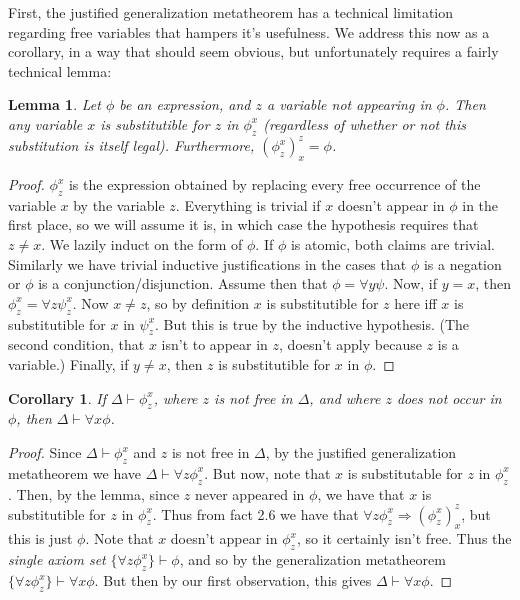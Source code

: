 \documentclass{article}
\theoremstyle{definition}
\theoremstyle{plain}
\theoremstyle{theorem}
\newtheorem{lemma}{Lemma}[section]
\newtheorem{corollary}{Corollary}[section]
\begin{document}
\par First, the justified generalization metatheorem has a technical limitation regarding free variables that hampers it's usefulness. We address this now as a corollary, in a way that should seem obvious, but unfortunately requires a fairly technical lemma:
\begin{lemma}
    Let $\phi$ be an expression, and $z$ a variable not appearing in $\phi$. Then any variable $x$ is substitutible for $z$ in $\phi_z^x$ (regardless of whether or not this substitution is itself legal). Furthermore, $(\phi_z^x)_x^z = \phi$.
\end{lemma}
\begin{proof}
    $\phi_z^x$ is the expression obtained by replacing every free occurrence of the variable $x$ by the variable $z$. Everything is trivial if $x$ doesn't appear in $\phi$ in the first place, so we will assume it is, in which case the hypothesis requires that $z \neq x$. We lazily induct on the form of $\phi$. If $\phi$ is atomic, both claims are trivial. Similarly we have trivial inductive justifications in the cases that $\phi$ is a negation or $\phi$ is a conjunction/disjunction. Assume then that $\phi = \forall y \psi$. Now, if $y = x$, then $\phi_z^x = \forall z \psi_z^x$. Now $x \neq z$, so by definition $x$ is substitutible for $z$ here iff $x$ is substitutible for $x$ in $\psi_z^x$. But this is true by the inductive hypothesis. (The second condition, that $x$ isn't to appear in $z$, doesn't apply because $z$ is a variable.) Finally, if $y \neq x$, then $z$ is substitutible for $x$ in $\phi$. 
\end{proof}
\begin{corollary}
    If $\Delta \vdash \phi_z^x$, where $z$ is not free in $\Delta$, and where $z$ does not occur in $\phi$, then $\Delta \vdash \forall x \phi$.
\end{corollary}
\begin{proof}
    Since $\Delta \vdash \phi_z^x$ and $z$ is not free in $\Delta$, by the justified generalization metatheorem we have $\Delta \vdash \forall z \phi_z^x$. But now, note that $x$ is substitutable for $z$ in $\phi_z^x$. Then, by the lemma, since $z$ never appeared in $\phi$, we have that $x$ is substitutible for $z$ in $\phi_z^x$. Thus from fact 2.6 we have that $\forall z \phi_z^x \Rightarrow (\phi_z^x)_x^z$, but this is just $\phi$. Note that $x$ doesn't appear in $\phi_z^x$, so it certainly isn't free. Thus the \textit{single axiom set} $\{ \forall z \phi_z^x \} \vdash \phi$, and so by the generalization metatheorem $\{ \forall z \phi_z^x \} \vdash \forall x \phi$. But then by our first observation, this gives $\Delta \vdash \forall x \phi$. 
\end{proof}
\end{document}
